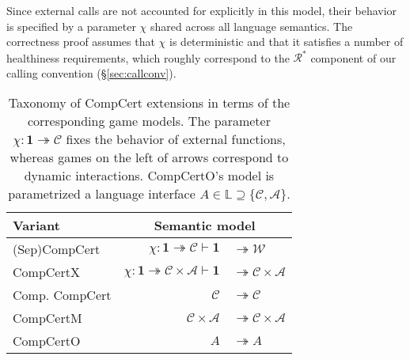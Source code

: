 \documentclass[sigplan,screen,review]{acmart}
\newcommand{\figsize}{\small}
\newcommand{\kw}[1]{\ensuremath{ \mathsf{#1} }}
\begin{document}
Since external calls are not accounted for explicitly
in this model,
their behavior is specified by a parameter $\chi$
shared across all language semantics.
The correctness proof assumes that $\chi$ is deterministic
and that it satisfies a number of healthiness requirements,
which roughly correspond to
the $\mathcal{R}^*$ component of our calling convention (\S\ref{sec:callconv}).


\begin{table} %
  \caption{Taxonomy of CompCert extensions
    in terms of the corresponding game models.
    The parameter $\chi : \mathbf{1} \twoheadrightarrow \mathcal{C}$
    fixes the behavior of external functions,
    whereas games on the left of arrows
    correspond to dynamic interactions.
    CompCertO's model is parametrized a language interface
    $A \in \mathbb{L} \supseteq \{\mathcal{C}, \mathcal{A}\}$.
  }
  \label{tbl:compcerts}
  \setlength\tabcolsep{1.2pt}
  \begin{tabular}{l@{\qquad}r@{}l}
    \toprule
    Variant & \multicolumn{2}{c}{Semantic model} \\ %
    \midrule
    (Sep)CompCert \cite{compcert,sepcompcert} &
      $\chi : \mathbf{1} \twoheadrightarrow \mathcal{C}
      \vdash \mathbf{1} $ & ${} \twoheadrightarrow \mathcal{W}$ \\
    CompCertX \cite{popl15} &
      \hspace{-1em}
      $\chi : \mathbf{1} \twoheadrightarrow \mathcal{C} \times \mathcal{A}
       \vdash
       \mathbf{1} $ & ${} \twoheadrightarrow \mathcal{C} \times \mathcal{A}$
       \\
    Comp. CompCert \cite{compcompcert} &
      $\mathcal{C}$ & ${} \twoheadrightarrow \mathcal{C}$ \\
    CompCertM \cite{compcertm} &
      $\mathcal{C} \times \mathcal{A} $ & ${}\twoheadrightarrow
       \mathcal{C} \times \mathcal{A}$ \\
    CompCertO &
      $A $ & ${}\twoheadrightarrow A$ \\
    \bottomrule
  \end{tabular}
\end{table}
\end{document}
